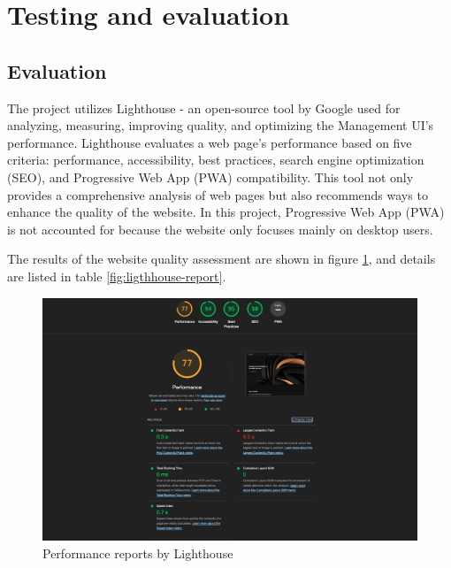 \documentclass[../Main.tex]{subfiles}
\begin{document}
\section{Testing and evaluation}
\subsection{Evaluation}
The project utilizes Lighthouse - an open-source tool by Google used for analyzing, measuring, improving quality, and optimizing the Management UI's performance. Lighthouse evaluates a web page's performance based on five criteria: performance, accessibility, best practices, search engine optimization (SEO), and Progressive Web App (PWA) compatibility\cite{lighthouse}. This tool not only provides a comprehensive analysis of web pages but also recommends ways to enhance the quality of the website. In this project, Progressive Web App (PWA) is not accounted for because the website only focuses mainly on desktop users. 

The results of the website quality assessment are shown in figure \ref{fig:ui_light-house}, and details are listed in table \ref{fig:ligthhouse-report}.
\begin{figure}[H]
    \centering
    \includegraphics[width=0.8\linewidth]{doc//imgs/ui_light-house.png}
    \caption{Performance reports by Lighthouse}
    \label{fig:ui_light-house}
\end{figure}
\end{document}
